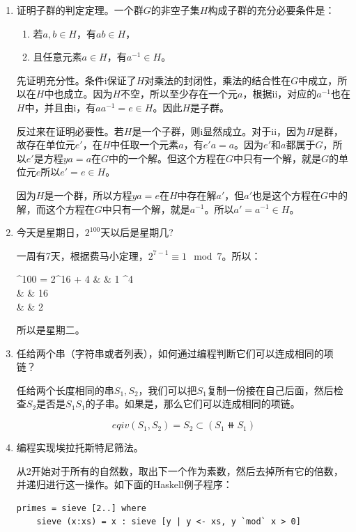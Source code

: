 \documentclass[UTF8]{article}
\begin{document}
\begin{enumerate}

\item 证明子群的判定定理。一个群$G$的非空子集$H$构成子群的充分必要条件是：
  \begin{enumerate}[i]
  \item 若$a, b \in H$，有$ab \in H$，
  \item 且任意元素$a \in H$，有$a^{-1} \in H$。
  \end{enumerate}

先证明充分性。条件i保证了$H$对乘法的封闭性，乘法的结合性在$G$中成立，所以在$H$中也成立。因为$H$不空，所以至少存在一个元$a$，根据ii，对应的$a^{-1}$也在$H$中，并且由i，有$aa^{-1} = e \in H$。因此$H$是子群。

反过来在证明必要性。若$H$是一个子群，则i显然成立。对于ii，因为$H$是群，故存在单位元$e'$，在$H$中任取一个元素$a$，有$e'a = a$。因为$e'$和$a$都属于$G$，所以$e'$是方程$ya = a$在$G$中的一个解。但这个方程在$G$中只有一个解，就是$G$的单位元$e$所以$e' = e \in H$。

因为$H$是一个群，所以方程$ya = e$在$H$中存在解$a'$，但$a'$也是这个方程在$G$中的解，而这个方程在$G$中只有一个解，就是$a^{-1}$。所以$a' = a^{-1} \in H$。

\item 今天是星期日，$2^{100}$天以后是星期几?

一周有7天，根据费马小定理，$2^{7-1} \equiv 1 \mod 7$。所以：

^{100} = 2^{16  + 4} & \equiv & 1 ^4  \\
  & \equiv & 16  \\
  & \equiv & 2  \\
\elre

所以是星期二。

\item 任给两个串（字符串或者列表），如何通过编程判断它们可以连成相同的项链？

任给两个长度相同的串$S_1, S_2$，我们可以把$S_1$复制一份接在自己后面，然后检查$S_2$是否是$S_1S_1$的子串。如果是，那么它们可以连成相同的项链。

\[
eqiv(S_1, S_2) = S_2 \subset (S_1 \doubleplus S_1)
\]

\item 编程实现埃拉托斯特尼筛法。

从2开始对于所有的自然数，取出下一个作为素数，然后去掉所有它的倍数，并递归进行这一操作。如下面的Haskell例子程序：
\lstset{language=Haskell, frame=single}
\begin{lstlisting}
primes = sieve [2..] where
    sieve (x:xs) = x : sieve [y | y <- xs, y `mod` x > 0]
\end{lstlisting}


\end{enumerate}
\end{document}
